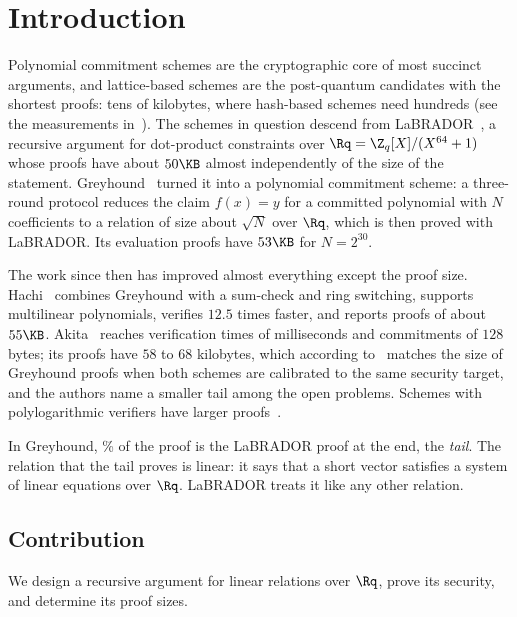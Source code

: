 \section{Introduction}\label{sec:intro}

Polynomial commitment schemes are the cryptographic core of most succinct arguments, and lattice-based schemes are the post-quantum candidates with the shortest proofs: tens of kilobytes, where hash-based schemes need hundreds (see the measurements in~\cite{DBK26}). The schemes in question descend from LaBRADOR~\cite{BS23}, a recursive argument for dot-product constraints over $\Rq=\Z_q[X]/(X^{64}+1)$ whose proofs have about $50\KB$ almost independently of the size of the statement. Greyhound~\cite{NS24} turned it into a polynomial commitment scheme: a three-round protocol reduces the claim $f(x)=y$ for a committed polynomial with $N$ coefficients to a relation of size about $\sqrt N$ over $\Rq$, which is then proved with LaBRADOR. Its evaluation proofs have $53\KB$ for $N=2^{30}$.

The work since then has improved almost everything except the proof size. Hachi~\cite{NOZ26} combines Greyhound with a sum-check and ring switching, supports multilinear polynomials, verifies $12.5$ times faster, and reports proofs of about $55\KB$. Akita~\cite{DBK26} reaches verification times of milliseconds and commitments of $128$ bytes; its proofs have $58$ to $68$ kilobytes, which according to~\cite{DBK26} matches the size of Greyhound proofs when both schemes are calibrated to the same security target, and the authors name a smaller tail among the open problems. Schemes with polylogarithmic verifiers have larger proofs~\cite{KK26,CNT26,KLNOT26}.

In Greyhound, \nTailShare\% of the proof is the LaBRADOR proof at the end, the \emph{tail}. The relation that the tail proves is linear: it says that a short vector satisfies a system of linear equations over $\Rq$. LaBRADOR treats it like any other relation.

\subsection{Contribution}

We design a recursive argument for linear relations over $\Rq$, prove its security, and determine its proof sizes.

